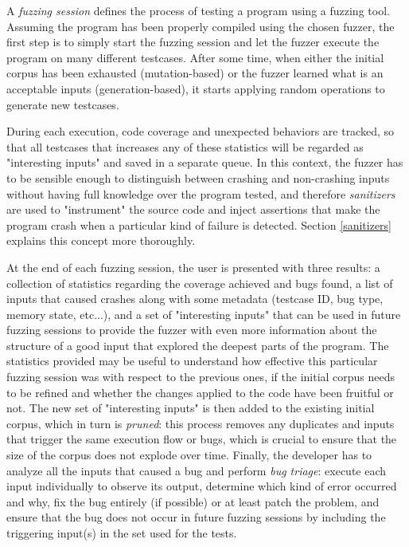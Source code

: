 \newpage
A \textit{fuzzing session} defines the process of testing a program using a fuzzing tool.
Assuming the program has been properly compiled using the chosen fuzzer, the first step is to simply start the fuzzing session and let the fuzzer execute the program on many different testcases. After some time, when either the initial corpus has been exhausted (mutation-based) or the fuzzer learned what is an acceptable inputs (generation-based), it starts applying random operations to generate new testcases. 

During each execution, code coverage and unexpected behaviors are tracked, so that all testcases that increases any of these statistics will be regarded as "interesting inputs" and saved in a separate queue. In this context, the fuzzer has to be sensible enough to distinguish between crashing and non-crashing inputs without having full knowledge over the program tested, and therefore \textit{sanitizers} are used to "instrument" the source code and inject assertions that make the program crash when a particular kind of failure is detected. Section \ref{sanitizers} explains this concept more thoroughly.

At the end of each fuzzing session, the user is presented with three results: a collection of statistics regarding the coverage achieved and bugs found, a list of inputs that caused crashes along with some metadata (testcase ID, bug type, memory state, etc...), and a set of "interesting inputs" that can be used in future fuzzing sessions to provide the fuzzer with even more information about the structure of a good input that explored the deepest parts of the program. 
The statistics provided may be useful to understand how effective this particular fuzzing session was with respect to the previous ones, if the initial corpus needs to be refined and whether the changes applied to the code have been fruitful or not.
The new set of "interesting inputs" is then added to the existing initial corpus, which in turn is \textit{pruned}: this process removes any duplicates and inputs that trigger the same execution flow or bugs, which is crucial to ensure that the size of the corpus does not explode over time.
Finally, the developer has to analyze all the inputs that caused a bug and perform \textit{bug triage}: execute each input individually to observe its output, determine which kind of error occurred and why, fix the bug entirely (if possible) or at least patch the problem, and ensure that the bug does not occur in future fuzzing sessions by including the triggering input(s) in the set used for the tests.

